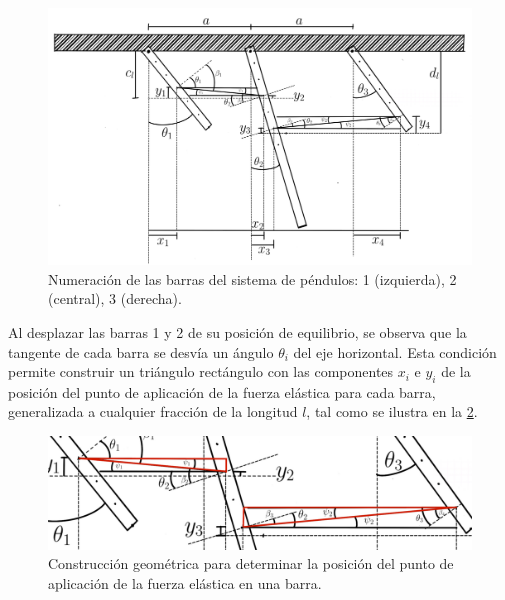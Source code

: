 \begin{figure}[htbp!]
  \centering
  \includegraphics[width=0.8\linewidth]{Figures/Ilustración_sin_título 4.pdf}
  \caption{Numeraci\'on de las barras del sistema de p\'endulos:
  1 (izquierda), 2 (central), 3 (derecha).}
  \label{fig:enumeracion_barras}
\end{figure}

Al desplazar las barras 1 y 2 de su posici\'on de equilibrio, se
observa que la tangente de cada barra se desv\'ia un \'angulo
$\theta_i$ del eje horizontal. Esta condici\'on permite
construir un tri\'angulo rect\'angulo con las componentes $x_i$ e
$y_i$ de la posici\'on del punto de aplicaci\'on de la fuerza
el\'astica para cada barra, generalizada a cualquier fracci\'on de
la longitud $l$, tal como se ilustra en la \cref{fig:triangulo_posicion}.

\begin{figure}[htbp!]
  \centering
  \includegraphics[width=0.8\linewidth]{Figures/Ilustración_sin_título 5.pdf}
  \caption{Construcci\'on geom\'etrica para determinar la posici\'on
  del punto de aplicaci\'on de la fuerza el\'astica en una barra.}
  \label{fig:triangulo_posicion}
\end{figure}

